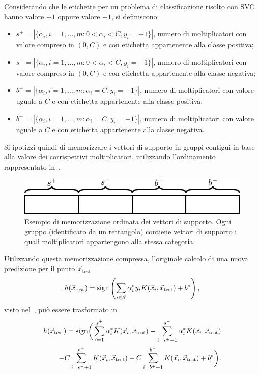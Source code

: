 Considerando che le etichette per un problema di classificazione risolto con SVC hanno valore $+1$ oppure valore $-1$, si definiscono:
\begin{itemize}
    \item $s^+ = |\{\alpha_i, i=1,\dots,m : 0 < \alpha_i < C, y_i=+1\}|$, numero di moltiplicatori con valore compreso in $(0, C)$ e con etichetta appartenente alla classe positiva;
    \item $s^- = |\{\alpha_i, i=1,\dots,m : 0 < \alpha_i < C, y_i=-1\}|$, numero di moltiplicatori con valore compreso in $(0, C)$ e con etichetta appartenente alla classe negativa;
    \item $b^+ = |\{\alpha_i, i=1,\dots,m : \alpha_i = C, y_i=+1\}|$, numero di moltiplicatori con valore uguale a $C$ e con etichetta appartenente alla classe positiva;
    \item $b^- = |\{\alpha_i, i=1,\dots,m : \alpha_i = C, y_i=-1\}|$, numero di moltiplicatori con valore uguale a $C$ e con etichetta appartenente alla classe negativa.
\end{itemize}
Si ipotizzi quindi di memorizzare i vettori di supporto in gruppi contigui in base alla valore dei corrispettivi moltiplicatori, utilizzando l'ordinamento rappresentato in~.
\begin{figure}
    \centering
    \includegraphics{img/memorizzazione_sv.pdf}
    \caption[Esempio di memorizzazione ordinata dei vettori di supporto.]{Esempio di memorizzazione ordinata dei vettori di supporto. Ogni gruppo (identificato da un rettangolo) contiene vettori di supporto i quali moltiplicatori appartengono alla stessa categoria.}
    \label{fig:schema_memorizzazione_sv}
\end{figure}
Utilizzando questa memorizzazione compressa, l'originale calcolo di una nuova predizione per il punto $\Vec{x}_{\text{test}}$
\begin{equation*}
    h(\Vec{x}_{\text{test}}) = \mathrm{sign}\left(\sum_{i \in S}\alpha_i^*y_iK(\Vec{x}_i, \Vec{x}_\text{test}) + b^*\right),
\end{equation*}
visto nel~, può essere trasformato in
\begin{align*}
    h(\Vec{x}_{\text{test}}) = \mathrm{sign}\bigg(
            \sum_{i=1}^{s^+}\alpha_i^*K(\Vec{x}_i, \Vec{x}_\text{test}) 
            -\sum_{i=s^++1}^{s^-}\alpha_i^*K(\Vec{x}_i, \Vec{x}_\text{test})\\
            +C\sum_{i=s^-+1}^{b^+}K(\Vec{x}_i, \Vec{x}_\text{test})
            -C\sum_{i=b^++1}^{b^-}K(\Vec{x}_i, \Vec{x}_\text{test}) 
            + b^*
        \bigg).
\end{align*}
